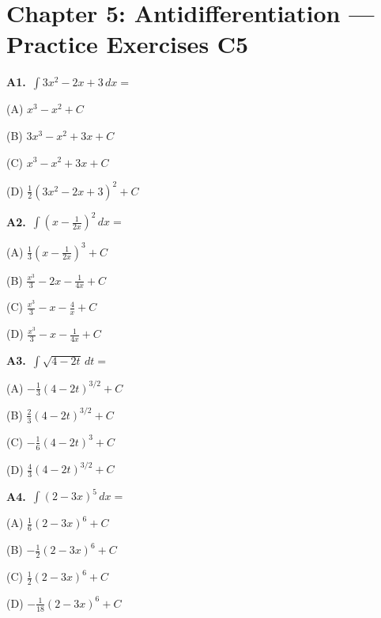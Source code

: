 \documentclass[11pt]{article}
\begin{document}
\section*{Chapter 5: Antidifferentiation --- Practice Exercises C5}

\bigskip\noindent\textbf{A1.}\ $\displaystyle\int 3x^2-2x+3\,dx=$
\begin{list}{}{\setlength{\leftmargin}{3em}\setlength{\labelwidth}{2.5em}\setlength{\itemsep}{0pt}\setlength{\topsep}{2pt}}
\item[(A)] $x^3-x^2+C$
\item[(B)] $3x^3-x^2+3x+C$
\item[(C)] $x^3-x^2+3x+C$
\item[(D)] $\frac12(3x^2-2x+3)^2+C$
\end{list}

\bigskip\noindent\textbf{A2.}\ $\displaystyle\int (x-\frac1{2x})^2\,dx=$
\begin{list}{}{\setlength{\leftmargin}{3em}\setlength{\labelwidth}{2.5em}\setlength{\itemsep}{0pt}\setlength{\topsep}{2pt}}
\item[(A)] $\frac13(x-\frac1{2x})^3+C$
\item[(B)] $\frac{x^3}3-2x-\frac1{4x}+C$
\item[(C)] $\frac{x^3}3-x-\frac4x+C$
\item[(D)] $\frac{x^3}3-x-\frac1{4x}+C$
\end{list}

\bigskip\noindent\textbf{A3.}\ $\displaystyle\int \sqrt{4-2t}\,dt=$
\begin{list}{}{\setlength{\leftmargin}{3em}\setlength{\labelwidth}{2.5em}\setlength{\itemsep}{0pt}\setlength{\topsep}{2pt}}
\item[(A)] $-\frac13(4-2t)^{3/2}+C$
\item[(B)] $\frac23(4-2t)^{3/2}+C$
\item[(C)] $-\frac16(4-2t)^3+C$
\item[(D)] $\frac43(4-2t)^{3/2}+C$
\end{list}

\bigskip\noindent\textbf{A4.}\ $\displaystyle\int (2-3x)^5\,dx=$
\begin{list}{}{\setlength{\leftmargin}{3em}\setlength{\labelwidth}{2.5em}\setlength{\itemsep}{0pt}\setlength{\topsep}{2pt}}
\item[(A)] $\frac16(2-3x)^6+C$
\item[(B)] $-\frac12(2-3x)^6+C$
\item[(C)] $\frac12(2-3x)^6+C$
\item[(D)] $-\frac1{18}(2-3x)^6+C$
\end{list}
\end{document}

